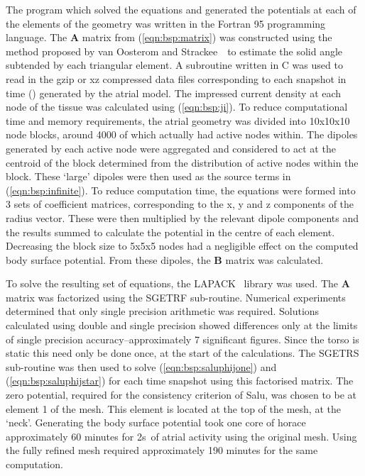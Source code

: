 The program which solved the equations and generated the potentials at each of
the elements of the geometry was written in the Fortran 95 programming language.
The $\mathbf{A}$ matrix from (\ref{eqn:bsp:matrix}) was constructed using the
method proposed by van Oosterom and Strackee~\cite{Oosterom1983}\ to
estimate the solid angle subtended by each triangular element.
A subroutine written in C was used to read in the gzip or xz compressed
data files corresponding to each snapshot in time () generated by the
atrial model.
The impressed current density at each node of the tissue was calculated using
(\ref{eqn:bsp:ji}).
To reduce computational time and memory requirements, the atrial geometry was
divided into 10x10x10 node blocks, around 4000 of which actually had active
nodes within.
The dipoles generated by each active node were aggregated and considered to act
at the centroid of the block determined from the distribution of active nodes
within the block.
These `large' dipoles were then used as the source terms in
(\ref{eqn:bsp:infinite}).
To reduce computation time, the equations were formed into 3 sets of coefficient
matrices, corresponding to the x, y and z components of the radius vector.
These were then multiplied by the relevant dipole components and the results
summed to calculate the potential in the centre of each element.
Decreasing the block size to 5x5x5 nodes had a negligible effect on the computed
body surface potential.
From these dipoles, the $\mathbf{B}$ matrix was calculated.

To solve the resulting set of equations, the LAPACK~\cite{lapack} library was
used.
The $\mathbf{A}$ matrix was factorized using the SGETRF sub-routine.
Numerical experiments determined that only single precision arithmetic was
required.
Solutions calculated using double and single precision showed differences only at
the limits of single precision accuracy--approximately 7 significant figures.
Since the torso is static this need only be done once, at the start of the
calculations.
The SGETRS sub-routine was then used to solve (\ref{eqn:bsp:saluphijone}) and
(\ref{eqn:bsp:saluphijstar}) for each time snapshot using this factorised
matrix.
The zero potential, required for the consistency criterion of Salu, was chosen
to be at element 1 of the mesh.
This element is located at the top of the mesh, at the `neck'.
Generating the body surface potential took one core of horace approximately 60
minutes for \unit{2}{s}\ of atrial activity using the original mesh.
Using the fully refined mesh required approximately 190 minutes for the same
computation.


